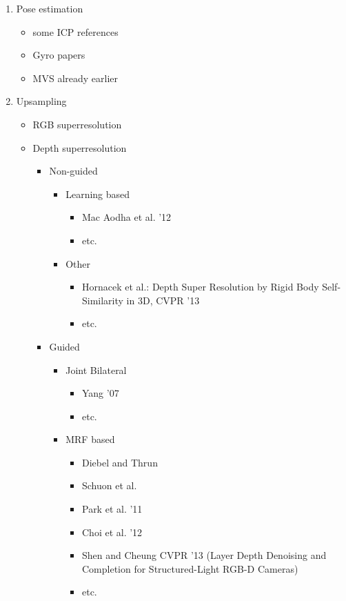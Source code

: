 \documentclass{ucl_thesis}
\begin{document}
\begin{enumerate}
\begin{itemize}
			
		\end{itemize}
			
 		\item Pose estimation
		\begin{itemize}
			\item some ICP references
			\item Gyro papers
			\item MVS already earlier
		\end{itemize}
		
		\item Upsampling
		\begin{itemize}
			\item RGB superresolution
			\item Depth superresolution
			\begin{itemize}
				\item Non-guided
				\begin{itemize}
					\item Learning based
						\begin{itemize}
							\item Mac Aodha et al. '12
							\item etc.
						\end{itemize}
					\item Other
					\begin{itemize}
						\item Hornacek et al.: Depth Super Resolution by Rigid Body Self-Similarity in 3D, CVPR '13
						\item etc.
					\end{itemize}
				\end{itemize}
				
				\item Guided
				\begin{itemize}
					\item Joint Bilateral
					\begin{itemize}
						\item Yang '07
						\item etc.
					\end{itemize}
					\item MRF based
					\begin{itemize}
						\item Diebel and Thrun
						\item Schuon et al.
						\item Park et al. '11
						\item Choi et al. '12
						\item Shen and Cheung CVPR '13 (Layer Depth Denoising and Completion for Structured-Light RGB-D Cameras)
						\item etc.
					\end{itemize}
					

\end{itemize}
\end{itemize}
\end{itemize}
\end{enumerate}
\end{document}
